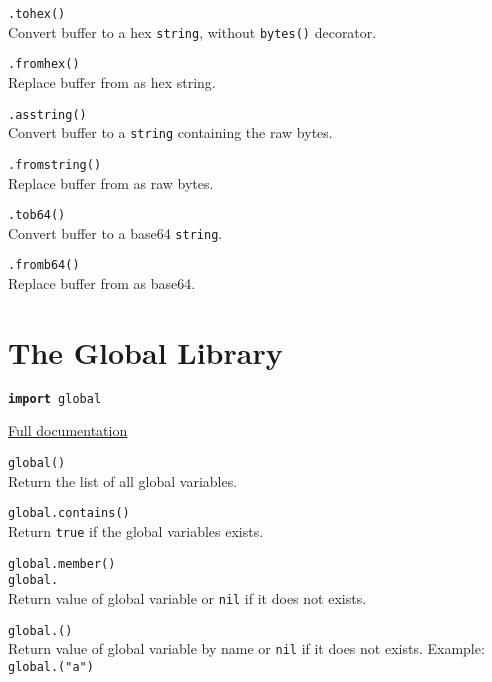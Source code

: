 \hangpar {}\texttt{.tohex()}\\
Convert  buffer to a hex \texttt{string}, without \texttt{bytes()} decorator.

\hangpar {}\texttt{.fromhex(}\texttt{)}\\
Replace  buffer from  as hex string.

\hangpar {}\texttt{.asstring()}\\
Convert  buffer to a \texttt{string} containing the raw bytes.

\hangpar {}\texttt{.fromstring(}\texttt{)}\\
Replace  buffer from  as raw bytes.

\hangpar {}\texttt{.tob64()}\\
Convert  buffer to a base64 \texttt{string}.

\hangpar {}\texttt{.fromb64(}\texttt{)}\\
Replace  buffer from  as base64.

\section*{The Global Library}

\hangpar \texttt{\textbf{import} global}

\hangpar \href{https://github.com/berry-lang/berry/wiki/Chapter-7\#module-global}{Full documentation}

\hangpar \texttt{global()}\\
Return the list of all global variables.

\hangpar \texttt{global.contains(}\texttt{)} \\
Return \texttt{true} if the global variables exists.

\hangpartwo \texttt{global.member(}\texttt{)}\\
\texttt{global.} \\	
Return value of global variable  or \texttt{nil} if it does not exists.

\hangpar \texttt{global.(}\texttt{)} \\
Return value of global variable  by name or \texttt{nil} if it does not exists. Example: \texttt{global.("a")}

